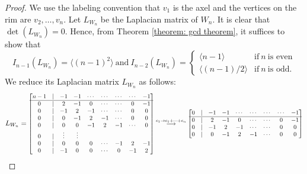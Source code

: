 \documentclass[11pt,reqno]{amsart}
\newcommand\scalemath[2]{\scalebox{#1}{\mbox{\ensuremath{\displaystyle #2}}}}
\theoremstyle{definition}
\theoremstyle{plain}
\begin{document}
\begin{proof}
We use the labeling convention that $v_1$ is the axel and the vertices on the rim are $v_2, \dots, v_{n}$.  
Let $L_{W_n}$ be the Laplacian matrix of $W_n$. It is clear that $\det(L_{W_n})=0$. Hence, from Theorem \ref{theorem: gcd theorem}, it suffices to show that 
\begin{equation*}
I_{n-1}(L_{W_n}) = \langle (n-1)^2 \rangle~\text{and}~ I_{n-2}(L_{W_n}) = \begin{cases}
\langle n-1 \rangle & \text{if}~ n ~\text{is even} \\
\langle (n-1)/2\rangle & \text{if}~ n ~\text{is odd}.
\end{cases}
\end{equation*}
We reduce its Laplacian matrix $L_{W_n}$ as follows:
\[
L_{W_n}=\scalemath{0.85}{\begin{bmatrix}
n-1 & | & -1 & -1 & \cdots & \cdots & \cdots & \cdots & -1 \\
\hline
0 & | & 2 & -1 & 0 & \cdots & \cdots & 0 & -1 \\
0 & | & - 1& 2 & -1 & \cdots & \cdots & 0 & 0 \\
0 & | & 0 & - 1& 2 & -1 & \cdots & 0 & 0 \\
0 & | & 0 & 0 & - 1& 2 & -1 & \cdots & 0 \\
0 & | & \vdots & \vdots \\
0 & | & 0 & 0 & 0 & \cdots & -1& 2 & -1 \\
0 & | & -1 & 0 & 0 & \cdots& 0 & -1 & 2 
\end{bmatrix} 
\stackrel{c_1 \to c_1 + \cdots + c_n}\longrightarrow \begin{bmatrix}
0 & | & -1 & -1 & \cdots & \cdots & \cdots & \cdots & -1 \\
\hline
0 & | & 2 & -1 & 0 & \cdots & \cdots & 0 & -1 \\
0 & | & - 1& 2 & -1 & \cdots & \cdots & 0 & 0 \\
0 & | & 0 & - 1& 2 & -1 & \cdots & 0 & 0 \\

\end{bmatrix}}\]
\end{proof}
\end{document}
